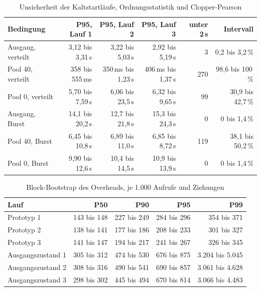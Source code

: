 \begin{table}[H]
  \caption{Unsicherheit der Kaltstartläufe, Ordnungsstatistik und Clopper-Pearson}
  \label{tab:kaltstart-ki}
  \footnotesize
  \setlength{\tabcolsep}{4pt}
  \begin{tabularx}{\textwidth}{@{}>{\RaggedRight\arraybackslash}X r r r r r@{}}
    \hline
    Bedingung & P95, Lauf 1 & P95, Lauf 2 & P95, Lauf 3 & unter 2\,s & Intervall \\
    \hline
    Ausgang, verteilt & 3,12 bis 3,31\,s & 3,22 bis 5,03\,s & 2,92 bis 5,19\,s & 3 & 0,2 bis 3,2\,\% \\
    Pool 40, verteilt & 358 bis 555\,ms & 350\,ms bis 1,23\,s & 406\,ms bis 1,37\,s & 270 & 98,6 bis 100\,\% \\
    Pool 0, verteilt & 5,70 bis 7,59\,s & 6,06 bis 23,5\,s & 6,32 bis 9,65\,s & 99 & 30,9 bis 42,7\,\% \\
    Ausgang, Burst & 14,1 bis 20,2\,s & 12,7 bis 21,8\,s & 15,3 bis 24,3\,s & 0 & 0 bis 1,4\,\% \\
    Pool 40, Burst & 6,45 bis 10,8\,s & 6,89 bis 11,0\,s & 6,85 bis 8,72\,s & 119 & 38,1 bis 50,2\,\% \\
    Pool 0, Burst & 9,90 bis 12,6\,s & 10,4 bis 14,5\,s & 10,9 bis 13,9\,s & 0 & 0 bis 1,4\,\% \\
    \hline
  \end{tabularx}
\end{table}

\begin{table}[H]
  \caption{Block-Bootstrap des Overheads, je 1.000 Aufrufe und Ziehungen}
  \label{tab:konfidenz}
  \small
  \begin{tabularx}{\textwidth}{@{}>{\RaggedRight\arraybackslash}X r r r r@{}}
    \hline
    Lauf & P50 & P90 & P95 & P99 \\
    \hline
    Prototyp 1 & 143 bis 148 & 227 bis 249 & 284 bis 296 & 354 bis 371 \\
    Prototyp 2 & 138 bis 141 & 177 bis 186 & 208 bis 233 & 301 bis 327 \\
    Prototyp 3 & 141 bis 147 & 194 bis 217 & 241 bis 267 & 326 bis 345 \\
    Ausgangszustand 1 & 305 bis 312 & 474 bis 530 & 676 bis 875 & 3.204 bis 5.045 \\
    Ausgangszustand 2 & 308 bis 316 & 490 bis 541 & 690 bis 857 & 3.061 bis 4.628 \\
    Ausgangszustand 3 & 298 bis 302 & 445 bis 494 & 670 bis 814 & 3.066 bis 4.483 \\
    \hline
  \end{tabularx}
\end{table}


